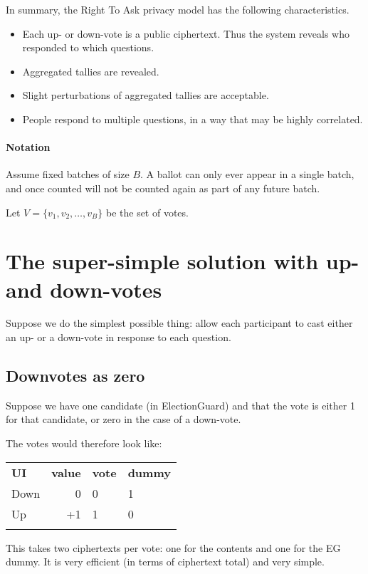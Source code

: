 \documentclass[10pt,a4paper]{article}
\begin{document}
In summary, the Right To Ask privacy model has the following characteristics. 
\begin{itemize}
	\item Each up- or down-vote is a public ciphertext. Thus the system reveals who responded to which questions.
	\item Aggregated tallies are revealed.
	\item Slight perturbations of aggregated tallies are acceptable.
	\item People respond to multiple questions, in a way that may be highly correlated.
\end{itemize}


\paragraph{Notation} Assume fixed batches of size $B$. A ballot can only ever appear in a single batch, and once counted will not be counted again as part of any future batch. 

Let $V = \{ v_1, v_2,\ldots,v_B\}$ be the set of votes.

\section{The super-simple solution with up- and down-votes}
Suppose we do the simplest possible thing: allow each participant to cast either an up- or a down-vote in response to each question.

\subsection{Downvotes as zero}
Suppose we have one candidate (in ElectionGuard) and that the vote is either 1 for that candidate, or zero in the case of a down-vote.

The votes would therefore look like:

\begin{tabular}{lrll}
	\\
	{\bf UI}  & {\bf value }&{\bf  vote} &{\bf  dummy }\\
	Down   & 0          & 0          & 1    \\
	Up   & +1          & 1          & 0    \\ \\
\end{tabular}

This takes two ciphertexts per vote: one for the contents and one for the EG dummy.
It is very efficient (in terms of ciphertext total) and very simple.
\end{document}
